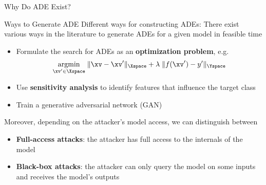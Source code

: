 \documentclass[11pt,compress,t,notes=noshow, aspectratio=169, xcolor=table]{beamer}
\begin{document}
\begin{frame}{Why Do ADE Exist?}
    
\end{frame}


\begin{vbframe}[c]{Ways to Generate ADE}
Different ways for constructing ADEs:
There exist various ways in the literature to generate ADEs for a given model in feasible time
\begin{itemize}
    \item Formulate the search for ADEs as an \textbf{optimization problem}, e.g. 
    \begin{equation*}
        \label{eq:optimization}
        \underset{\xv'\in \Xspace}{\text{argmin}}\; \| \xv-\xv' \|_{\Xspace} + \lambda\;    \|f(\xv')-y'\|_{\Yspace}
    \end{equation*}
    \item Use \textbf{sensitivity analysis} to identify features that influence the target class
    \item Train a generative adversarial network (GAN) 
\end{itemize}
Moreover, depending on the attacker's model access, we can distinguish between
\begin{itemize}
    \item \textbf{Full-access attacks}: the attacker has full access to the internals of the model
    \item \textbf{Black-box attacks}: the attacker can only query the model on some inputs and receives the model's outputs
\end{itemize}
\end{vbframe}
\end{document}
